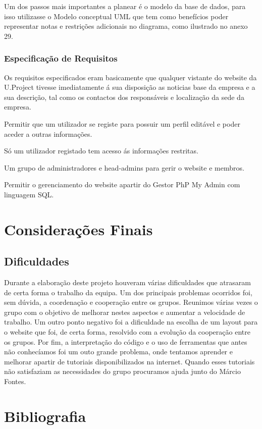 \documentclass[11pt]{report}
\begin{document}
	Um dos passos mais importantes a planear é o modelo da base de dados, para isso utilizasse o Modelo conceptual UML que tem como benefícios poder representar notas e restrições adicionais no diagrama, como ilustrado no anexo 29.

\subsection{Especificação de Requisitos}

Os requisitos especificados eram basicamente que qualquer vistante do website da U.Project tivesse imediatamente á sua disposição as noticias base da empresa e a sua descrição, tal como os contactos dos responsáveis e localização da sede da empresa.

Permitir que um utilizador se registe para possuir um perfil editável e poder aceder a outras informações.

Só um utilizador registado tem acesso ás informações restritas.

Um grupo de administradores e head-admins para gerir o website e membros.

Permitir o gerenciamento do website apartir do Gestor PhP My Admin com linguagem SQL.

\chapter{Considerações Finais}

\section{Dificuldades}
Durante a elaboração deste projeto houveram várias dificuldades que atrasaram de certa forma o trabalho da equipa.
Um dos principais problemas ocorridos foi, sem dúvida, a coordenação e cooperação entre os grupos. Reunimos várias vezes o grupo com o objetivo de melhorar nestes aspectos e aumentar a velocidade de trabalho.
Um outro ponto negativo foi a dificuldade na escolha de um layout para o website que foi, de certa forma, resolvido com a evolução da cooperação entre os grupos.
Por fim, a interpretação do código e o uso de ferramentas que antes não conhecíamos foi um outo grande problema, onde tentamos aprender e melhorar apartir de tutoriais disponibilizados na internet. Quando esses tutoriais não satisfaziam as necessidades do grupo procuramos ajuda junto do Márcio Fontes.
\newpage

\chapter*{Bibliografia}
\end{document}
